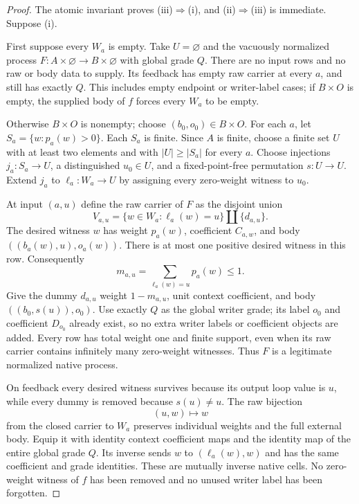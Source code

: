 \documentclass[11pt]{article}
\begin{document}
\begin{proof}
The atomic invariant proves (iii)$\Rightarrow$(i), and (ii)$\Rightarrow$(iii) is immediate. Suppose (i).

First suppose every $W_a$ is empty. Take $U=\varnothing$ and the vacuously normalized process $F:A\times\varnothing\to B\times\varnothing$ with global grade $Q$. There are no input rows and no raw or body data to supply. Its feedback has empty raw carrier at every $a$, and still has exactly $Q$. This includes empty endpoint or writer-label cases; if $B\times O$ is empty, the supplied body of $f$ forces every $W_a$ to be empty.

Otherwise $B\times O$ is nonempty; choose $(b_0,o_0)\in B\times O$. For each $a$, let $S_a=\{w:p_a(w)>0\}$. Each $S_a$ is finite. Since $A$ is finite, choose a finite set $U$ with at least two elements and with $|U|\geq |S_a|$ for every $a$. Choose injections $j_a:S_a\to U$, a distinguished $u_0\in U$, and a fixed-point-free permutation $s:U\to U$. Extend $j_a$ to $\ell_a:W_a\to U$ by assigning every zero-weight witness to $u_0$.

At input $(a,u)$ define the raw carrier of $F$ as the disjoint union
\[
 V_{a,u}=\{w\in W_a:\ell_a(w)=u\}\amalg\{d_{a,u}\}.
\]
The desired witness $w$ has weight $p_a(w)$, coefficient $C_{a,w}$, and body $((b_a(w),u),o_a(w))$. There is at most one positive desired witness in this row. Consequently
\[
 m_{a,u}=\sum_{\ell_a(w)=u}p_a(w)\leq 1.
\]
Give the dummy $d_{a,u}$ weight $1-m_{a,u}$, unit context coefficient, and body $((b_0,s(u)),o_0)$. Use exactly $Q$ as the global writer grade; its label $o_0$ and coefficient $D_{o_0}$ already exist, so no extra writer labels or coefficient objects are added. Every row has total weight one and finite support, even when its raw carrier contains infinitely many zero-weight witnesses. Thus $F$ is a legitimate normalized native process.

On feedback every desired witness survives because its output loop value is $u$, while every dummy is removed because $s(u)\ne u$. The raw bijection
\[
 (u,w)\longmapsto w
\]
from the closed carrier to $W_a$ preserves individual weights and the full external body. Equip it with identity context coefficient maps and the identity map of the entire global grade $Q$. Its inverse sends $w$ to $(\ell_a(w),w)$ and has the same coefficient and grade identities. These are mutually inverse native cells. No zero-weight witness of $f$ has been removed and no unused writer label has been forgotten.
\end{proof}
\end{document}
